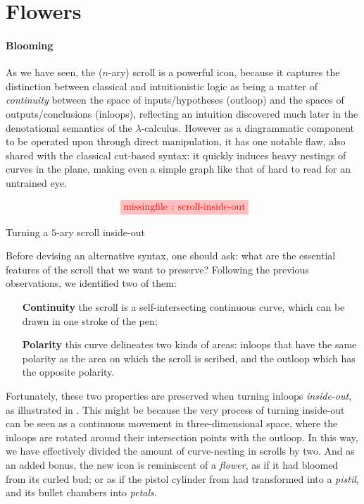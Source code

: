 \section{Flowers}

\paragraph{Blooming}

As we have seen, the ($n$-ary) scroll is a powerful icon, because it captures
the distinction between classical and intuitionistic logic as being a matter of
\emph{continuity} between the space of inputs/hypotheses (outloop) and the
spaces of outputs/conclusions (inloops), reflecting an intuition discovered much
later in the denotational semantics of the $\lambda$-calculus. However as a
diagrammatic component to be operated upon through direct manipulation, it has
one notable flaw, also shared with the classical cut-based syntax: it quickly
induces heavy nestings of curves in the plane, making even a simple graph like
that of  hard to read for an untrained eye.

\begin{marginfigure}
  $$
  \tikzfig{1}{0.4}{scroll-inside-out}
  $$
  \caption{Turning a $5$-ary scroll inside-out}
\end{marginfigure}

Before devising an alternative syntax, one should ask: what are the essential
features of the scroll that we want to preserve? Following the previous
observations, we identified two of them:
\begin{itemize}
  \item[\textbf{Continuity}] the scroll is a self-intersecting continuous curve,
  which can be drawn in one stroke of the pen;
  \item[\textbf{Polarity}] this curve delineates two kinds of areas: inloops that have
  the same polarity as the area on which the scroll is scribed, and the outloop
  which has the opposite polarity.
\end{itemize}

Fortunately, these two properties are preserved when turning inloops
\emph{inside-out}, as illustrated in . This might be
because the very process of turning inside-out can be seen as a continuous
movement in three-dimensional space, where the inloops are rotated around their
intersection points with the outloop. In this way, we have effectively divided
the amount of curve-nesting in scrolls by two. And as an added bonus, the new
icon is reminiscent of a \emph{flower}, as if it had bloomed from its curled
bud; or as if the pistol cylinder from  had transformed into
a \emph{pistil}, and its bullet chambers into \emph{petals}.

